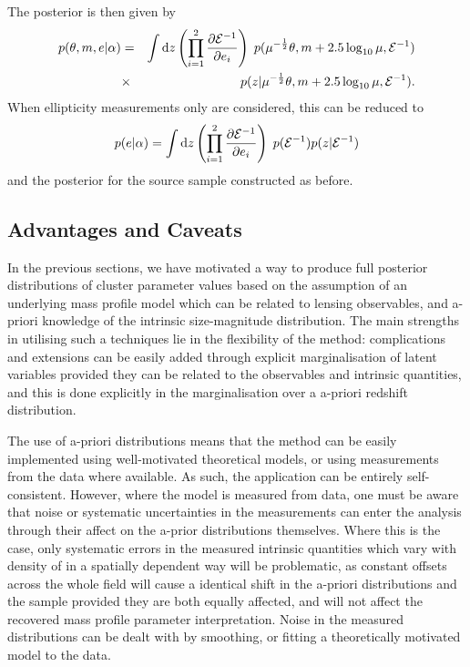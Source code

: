 \documentclass[useAMS,usenatbib,times,letter,amssymb]{mn2e}
\def\be{\begin{equation}}
\def\ee{\end{equation}}
\def\bea{\begin{eqnarray}}
\def\eea{\end{eqnarray}}
\def\lg10{\log_{10}}
\begin{document}
The posterior is then given by
\bea
p(\theta, m, e|\alpha) &=& \int {\rm d}z \left(\prod_{i=1}^2 \frac{\partial \mathcal{E}^{-1}}{\partial e_{i}}\right) \; p(\mu^{-\frac{1}{2}}\theta,m+2.5\lg10{\mu},\mathcal{E}^{-1})\nonumber\\
&\times& p(z|\mu^{-\frac{1}{2}}\theta,m+2.5\lg10{\mu},\mathcal{E}^{-1}).
\eea
When ellipticity measurements only are considered, this can be reduced to 
\be
p(e|\alpha) = \int {\rm d}z  \left(\prod_{i=1}^2 \frac{\partial \mathcal{E}^{-1}}{\partial e_{i}}\right) \; p(\mathcal{E}^{-1})p(z|\mathcal{E}^{-1})
\ee
and the posterior for the source sample constructed as before. 

\subsection{Advantages and Caveats}


In the previous sections, we have motivated a way to produce full posterior distributions of cluster parameter values based on the assumption of an underlying mass profile model which can be related to lensing observables, and a-priori knowledge of the intrinsic size-magnitude distribution. The main strengths in utilising such a techniques lie in the flexibility of the method: complications and extensions can be easily added through explicit marginalisation of latent variables provided they can be related to the observables and intrinsic quantities, and this is done explicitly in the marginalisation over a a-priori redshift distribution.

The use of a-priori distributions means that the method can be easily implemented using well-motivated theoretical models, or using measurements from the data where available. As such, the application can be entirely self-consistent. However, where the model is measured from data, one must be aware that noise or systematic uncertainties in the measurements can enter the analysis through their affect on the a-prior distributions themselves. Where this is the case, only systematic errors in the measured intrinsic quantities which vary with density of in a spatially dependent way will be problematic, as constant offsets across the whole field will cause a identical shift in the a-priori distributions and the sample provided they are both equally affected, and will not affect the recovered mass profile parameter interpretation. Noise in the measured distributions can be dealt with by smoothing, or fitting a theoretically motivated model to the data.
\end{document}
